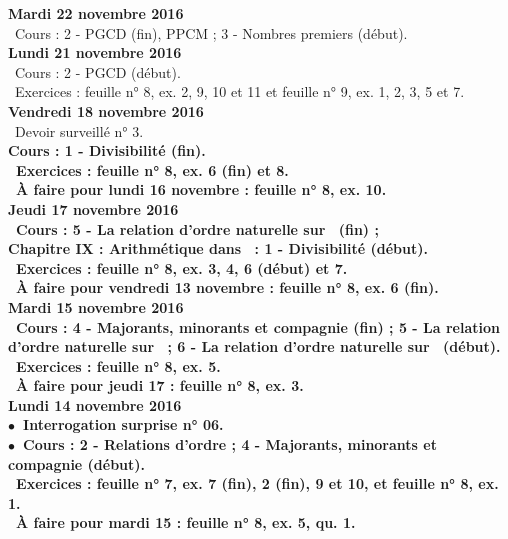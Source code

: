 \documentclass[12pt,a4paper]{article}
\begin{document}
\noindent\textbf{\bf Mardi 22 novembre 2016 }\\
\bu\ Cours : 2 - PGCD (fin), PPCM ; 3 - Nombres premiers (début).\vspace{.4cm}\\
   
\noindent\textbf{\bf Lundi 21 novembre 2016 }\\
\bu\ Cours : 2 - PGCD (début).\\
\bu\ Exercices : feuille n° 8, ex. 2, 9, 10 et 11 et feuille n° 9, ex. 1, 2, 3, 5 et 7.\vspace{.4cm}\\

\noindent\textbf{Vendredi 18 novembre 2016 }\\
\bu\ Devoir surveillé n° 3.\\
\bf Cours : 1 - Divisibilité (fin).\\
\bu\ Exercices : feuille n° 8, ex. 6 (fin) et 8.\\
\bu\ À faire pour lundi 16 novembre : feuille n° 8, ex. 10.\vspace{.4cm}\\
 
\noindent\textbf{Jeudi 17 novembre 2016 }\\
\bu\ Cours : 5 - La relation d'ordre naturelle sur \R\ (fin) ;\\
\bf Chapitre IX \rm : Arithmétique dans \Z\ : 1 - Divisibilité (début).\\
\bu\ Exercices : feuille n° 8, ex. 3, 4, 6 (début) et 7.\\
\bu\ À faire pour vendredi 13 novembre : feuille n° 8, ex. 6 (fin).\vspace{.4cm}\\

\noindent\textbf{\bf Mardi 15 novembre 2016 }\\
\bu\ Cours : 4 - Majorants, minorants et compagnie (fin) ; 5 - La relation d'ordre naturelle sur \N\ ; 6 - La relation 
d'ordre naturelle sur \R\ (début).\\
\bu\ Exercices : feuille n° 8, ex. 5.\\
\bu\ À faire pour jeudi 17 : feuille n° 8, ex. 3.\vspace{.4cm}\\

\noindent\textbf{ Lundi 14 novembre 2016 }\\
$\bullet$\ Interrogation surprise n° 06.\\
$\bullet$\ Cours : 2 - Relations d'ordre ;  4 - Majorants, minorants et compagnie (début).\\
\bu\ Exercices : feuille n° 7, ex. 7 (fin), 2 (fin), 9 et 10, et feuille n° 8, ex. 1.\\
\bu\ À faire pour mardi 15 : feuille n° 8, ex. 5, qu. 1.\vspace{.4cm}\\
\end{document}
